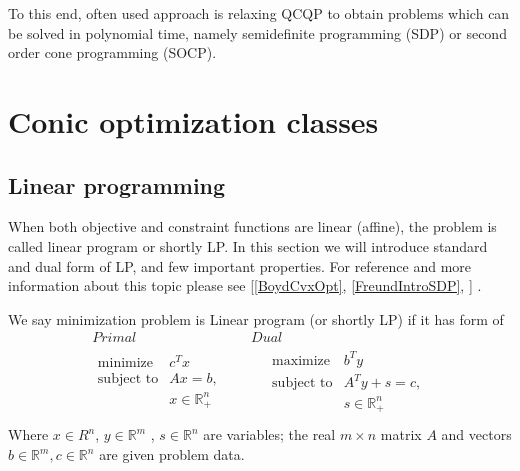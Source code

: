 \documentclass[10pt,oneside]{book}
\theoremstyle{definition}
\begin{document}
To this end, often used approach is relaxing QCQP to obtain problems which can be solved in polynomial time, namely semidefinite programming (SDP) or second order cone programming  (SOCP). 

\section{Conic optimization classes}
















\subsection{Linear programming}

When both objective and constraint functions are linear (affine), the problem is called linear program or shortly LP.
In this section we will introduce standard and dual form of LP, and few important properties. For reference and more information about this topic please see [\ref{BoydCvxOpt}, \ref{FreundIntroSDP},  ] .

\label{defLP}
We say minimization problem is Linear program (or shortly LP) if it has form of 
\begin{equation}
\label{LP} 
\begin{array}{c|c}
Primal & Dual \\
\begin{array}{ll}
\mbox{minimize} & c^Tx \\
\mbox{subject to}& Ax = b ,  \\
& x \in \mathbb{R}^n_+\\

\end{array} 
\ \ \ \ \ & \ \ \ \ \ 
\begin{array}{ll}
\mbox{maximize} & b^Ty \\
\mbox{subject to}& A^Ty +s = c ,  \\
& s\in \mathbb{R}^n_+ \\
\end{array}
\end{array} 
\tag{LP}
\end{equation}
Where $x\in R^n$, $y\in \mathbb{R}^m$ , $s\in \mathbb{R}^n$ are variables; the real $m\times n$ matrix $A$ and vectors $b \in \mathbb{R}^m, c\in \mathbb{R}^n$ are given problem data.
\end{document}
